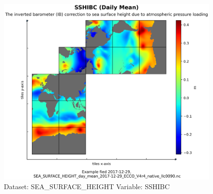 \begin{figure}[H]
\centering
\includegraphics[width=\textwidth]{../images/plots/native_plots/Sea_Surface_Height/SSHIBC.png}
\caption{Dataset: SEA\_SURFACE\_HEIGHT Variable: SSHIBC}
\label{tab:table-SEA_SURFACE_HEIGHT_SSHIBC-Plot}
\end{figure}
\pagebreak
